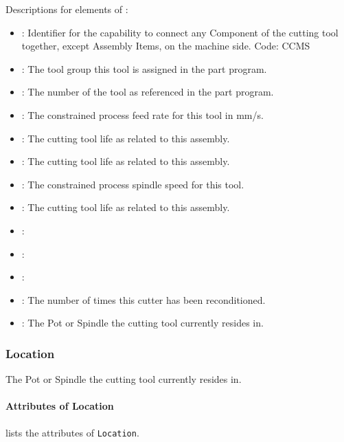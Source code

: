 Descriptions for elements of :

\begin{itemize}
\item {} : Identifier for the capability to connect any Component of the cutting tool together, except Assembly Items, on the machine side. Code: CCMS
\item {} : The tool group this tool is assigned in the part program.
\item {} : The number of the tool as referenced in the part program.
\item {} : The constrained process feed rate for this tool in mm/s.
\item {} : The cutting tool life as related to this assembly.
\item {} : The cutting tool life as related to this assembly.
\item {} : The constrained process spindle speed for this tool.

\item {} : The cutting tool life as related to this assembly.
\item {} : 
\item {} : 
\item {} : 
\item {} : The number of times this cutter has been reconditioned.

\item {} : The Pot or Spindle the cutting tool currently resides in.
\end{itemize}

\subsubsection{Location}
\label{sec:Location}



The Pot or Spindle the cutting tool currently resides in.


\paragraph{Attributes of Location}\mbox{}
\label{sec:Attributes of Location}

 lists the attributes of \texttt{Location}.

